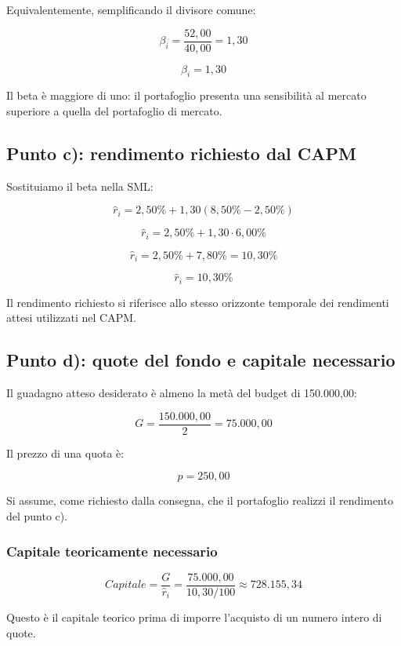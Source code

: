 \noindent Equivalentemente, semplificando il divisore comune:

\[
    \beta_i=\frac{52{,}00}{40{,}00}=1{,}30
\]

\[
    \boxed{\beta_i=1{,}30}
\]

\noindent Il beta è maggiore di uno: il portafoglio presenta
una sensibilità al mercato superiore a quella
del portafoglio di mercato.

\subsection{Punto c): rendimento richiesto dal CAPM}

\noindent Sostituiamo il beta nella SML:

\[
    \widehat r_i
    =
    2{,}50\%+1{,}30(8{,}50\%-2{,}50\%)
\]

\[
    \widehat r_i
    =
    2{,}50\%+1{,}30\cdot6{,}00\%
\]

\[
    \widehat r_i
    =
    2{,}50\%+7{,}80\%
    =
    10{,}30\%
\]

\[
    \boxed{\widehat r_i=10{,}30\%}
\]

\noindent Il rendimento richiesto si riferisce allo stesso
orizzonte temporale dei rendimenti attesi
utilizzati nel CAPM.

\subsection{Punto d): quote del fondo e capitale necessario}

\noindent Il guadagno atteso desiderato è almeno la metà
del budget di 150.000,00:

\[
    G=\frac{150.000{,}00}{2}=75.000{,}00
\]

\noindent Il prezzo di una quota è:

\[
    p=250{,}00
\]

\noindent Si assume, come richiesto dalla consegna, che il portafoglio
realizzi il rendimento del punto c).

\subsubsection*{Capitale teoricamente necessario}

\[
    Capitale
    =
    \frac{G}{\widehat r_i}
    =
    \frac{75.000{,}00}{10{,}30/100}
    \approx728.155{,}34
\]

\noindent Questo è il capitale teorico prima di imporre
l'acquisto di un numero intero di quote.

